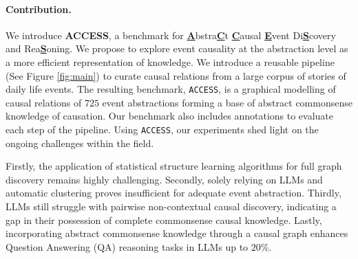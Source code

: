 \paragraph{Contribution.}
We introduce \textbf{ACCESS}, a benchmark for \underline{\textbf{A}}bstra\underline{\textbf{C}}t \underline{\textbf{C}}ausal \underline{\textbf{E}}vent Di\underline{\textbf{S}}covery and Rea\underline{\textbf{S}}oning. We propose to explore event causality at the abstraction level as a more efficient representation of knowledge. 
We introduce a reusable pipeline (See Figure \ref{fig:main}) to curate causal relations from a large corpus of stories of daily life events. The resulting benchmark, \texttt{ACCESS}, is a graphical modelling of causal relations of $725$ event abstractions forming a base of abstract commonsense knowledge of causation. Our benchmark also includes annotations to evaluate each step of the pipeline. Using \texttt{ACCESS}, our experiments shed light on the ongoing challenges within the field. 

Firstly, the application of statistical structure learning algorithms for full graph discovery remains highly challenging. Secondly, solely relying on LLMs and automatic clustering proves insufficient for adequate event abstraction. Thirdly, LLMs still struggle with pairwise non-contextual causal discovery, indicating a gap in their possession of complete commonsense causal knowledge. Lastly, incorporating abstract commonsense knowledge through a causal graph enhances Question Answering (QA) reasoning tasks in LLMs up to $20\%$.  
